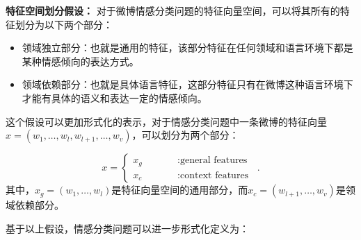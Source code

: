 \begin{theorem}[假设]
\textbf{特征空间划分假设：} 对于微博情感分类问题的特征向量空间，可以将其所有的特征划分为以下两个部分：
\begin{itemize}
\item{领域独立部分：}也就是通用的特征，该部分特征在任何领域和语言环境下都是某种情感倾向的表达方式。
\item{领域依赖部分：}也就是具体语言特征，这部分特征只有在微博这种语言环境下才能有具体的语义和表达一定的情感倾向。
\end{itemize}
\end{theorem}
这个假设可以更加形式化的表示，对于情感分类问题中一条微博的特征向量$ x=\left(  w_{1},\dots,w_{l},w_{l+1},\dots,w_{v} \right) $，可以划分为两个部分：

\begin{equation}
\label{e2}
x=\left\{
\begin{array}{rcl}
x_{g}     & \qquad        &:\mbox{general features}\\
x_{c}     &  \qquad       &:\mbox{context features}
\end{array}
\right. \enspace .
\end{equation}
其中，$ x_{g}= \left( w_{1},\dots,w_{l}\right) $是特征向量空间的通用部分，而$ x_{c}= \left( w_{l+1},\dots,w_{v}\right) $是领域依赖部分。

基于以上假设，情感分类问题可以进一步形式化定义为：

